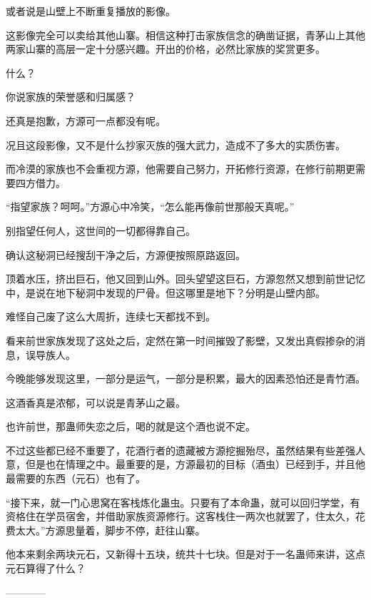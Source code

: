 \begin{this_body}
或者说是山壁上不断重复播放的影像。

这影像完全可以卖给其他山寨。相信这种打击家族信念的确凿证据，青茅山上其他两家山寨的高层一定十分感兴趣。开出的价格，必然比家族的奖赏更多。

什么？

你说家族的荣誉感和归属感？

还真是抱歉，方源可一点都没有呢。

况且这段影像，又不是什么抄家灭族的强大武力，造成不了多大的实质伤害。

而冷漠的家族也不会重视方源，他需要自己努力，开拓修行资源，在修行前期更需要四方借力。

“指望家族？呵呵。”方源心中冷笑，“怎么能再像前世那般天真呢。”

别指望任何人，这世间的一切都得靠自己。

确认这秘洞已经搜刮干净之后，方源便按照原路返回。

顶着水压，挤出巨石，他又回到山外。回头望望这巨石，方源忽然又想到前世记忆中，是说在地下秘洞中发现的尸骨。但这哪里是地下？分明是山壁内部。

难怪自己废了这么大周折，连续七天都找不到。

看来前世家族发现了这处之后，定然在第一时间摧毁了影壁，又发出真假掺杂的消息，误导族人。

今晚能够发现这里，一部分是运气，一部分是积累，最大的因素恐怕还是青竹酒。

这酒香真是浓郁，可以说是青茅山之最。

也许前世，那蛊师失恋之后，喝的就是这个酒也说不定。

不过这些都已经不重要了，花酒行者的遗藏被方源挖掘殆尽，虽然结果有些差强人意，但是也在情理之中。最重要的是，方源最初的目标（酒虫）已经到手，并且他最需要的东西（元石）也有了。

“接下来，就一门心思窝在客栈炼化蛊虫。只要有了本命蛊，就可以回归学堂，有资格住在学员宿舍，并借助家族资源修行。这客栈住一两次也就罢了，住太久，花费太大。”方源思量着，脚步不停，赶往山寨。

他本来剩余两块元石，又新得十五块，统共十七块。但是对于一名蛊师来讲，这点元石算得了什么？

------------

\end{this_body}

